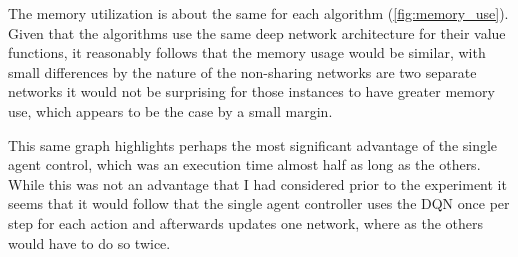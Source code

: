 \documentclass[12pt,letterpaper]{exam}
\begin{document}
\begin{questions}
The memory utilization is about the same for each algorithm 
(\cref{fig:memory_use}). Given that the algorithms use the same deep network 
architecture for their value functions, it reasonably follows that the memory 
usage would be similar, with small differences by the nature of the non-sharing 
networks are two separate networks it would not be surprising for those 
instances to have greater memory use, which appears to be the case by a
small margin.

This same graph highlights perhaps the most significant advantage of 
the single agent control, which was an execution time almost half
as long as the others. While this was not an advantage that I had 
considered prior to the experiment it seems that it would follow
that the single agent controller uses the DQN once per step for each 
action and afterwards updates one network, where as the others would 
have to do so twice.

\end{questions}


\clearpage
\end{document}

